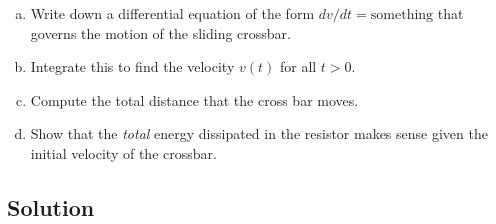 \documentclass[solutions]{esg8022pset}
\begin{document}
  \begin{enumerate}[(a)]
    \item Write down a differential equation of the form $dv/dt =
      \text{something}$ that governs the motion of the sliding crossbar.
    \item Integrate this to find the velocity $v(t)$ for all $t > 0$.
    \item Compute the total distance that the cross bar moves.
    \item Show that the \emph{total} energy dissipated in the resistor makes
      sense given the initial velocity of the crossbar.
  \end{enumerate}
\subsection{Solution}
\end{document}
